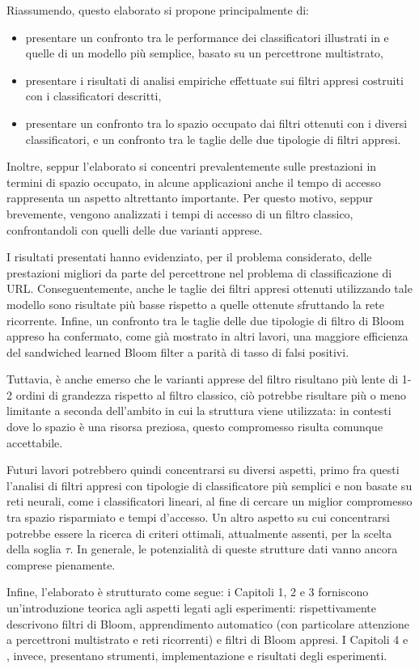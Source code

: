 \documentclass[4apaper,11pt]{article}
\begin{document}
Riassumendo, questo elaborato si propone principalmente di: 
\begin{itemize}
    \item presentare un confronto tra le performance dei classificatori illustrati in \cite{ma2020} e quelle di un modello più semplice, basato su un percettrone multistrato,
    \item presentare i risultati di analisi empiriche effettuate sui filtri appresi costruiti con i classificatori descritti,
    \item presentare un confronto tra lo spazio occupato dai filtri ottenuti con i diversi classificatori, e un confronto tra le taglie delle due tipologie di filtri appresi.
\end{itemize}
Inoltre, seppur l'elaborato si concentri prevalentemente sulle prestazioni in termini di spazio occupato, in alcune applicazioni anche il tempo di accesso rappresenta un aspetto altrettanto importante. Per questo motivo, seppur brevemente, vengono analizzati i tempi di accesso di un filtro classico, confrontandoli con quelli delle due varianti apprese. 

I risultati presentati hanno evidenziato, per il problema considerato, delle prestazioni migliori da parte del percettrone nel problema di classificazione di URL. Conseguentemente, anche le taglie dei filtri appresi ottenuti utilizzando tale modello sono risultate più basse rispetto a quelle ottenute sfruttando la rete ricorrente. Infine, un confronto tra le taglie delle due tipologie di filtro di Bloom appreso ha confermato, come già mostrato in altri lavori, una maggiore efficienza del sandwiched learned Bloom filter a parità di tasso di falsi positivi.

Tuttavia, è anche emerso che le varianti apprese del filtro risultano più lente di 1-2 ordini di grandezza rispetto al filtro classico, ciò potrebbe risultare più o meno limitante a seconda dell'ambito in cui la struttura viene utilizzata: in contesti dove lo spazio è una risorsa preziosa, questo compromesso risulta comunque accettabile. 

Futuri lavori potrebbero quindi concentrarsi su diversi aspetti, primo fra questi l'analisi di filtri appresi con tipologie di classificatore più semplici e non basate su reti neurali, come i classificatori lineari, al fine di cercare un miglior compromesso tra spazio risparmiato e tempi d'accesso. Un altro aspetto su cui concentrarsi potrebbe essere la ricerca di criteri ottimali, attualmente assenti, per la scelta della soglia $\tau$. In generale, le potenzialità di queste strutture dati vanno ancora comprese pienamente.

Infine, l'elaborato è strutturato come segue: i Capitoli 1, 2 e 3 forniscono un'introduzione teorica agli aspetti legati agli esperimenti: rispettivamente descrivono filtri di Bloom, apprendimento automatico (con particolare attenzione a percettroni multistrato e reti ricorrenti) e filtri di Bloom appresi. I Capitoli 4 e , invece, presentano strumenti, implementazione e risultati degli esperimenti.
\printbibliography
\end{document}
